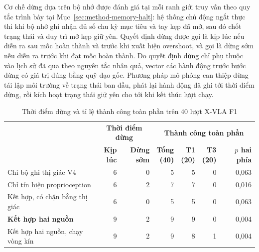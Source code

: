 \label{sec:halt-timing}
\label{sec:halt-forks}
Cơ chế dừng dựa trên bộ nhớ được đánh giá tại mỗi ranh giới truy vấn theo quy tắc trình bày tại Mục~\ref{sec:method-memory-halt}: hệ thống chủ động ngắt thực thi khi bộ nhớ ghi nhận đủ số chu kỳ mục tiêu và tay kẹp đã mở, sau đó chốt trạng thái và duy trì mở kẹp giữ yên. Quyết định dừng được gọi là kịp lúc nếu diễn ra sau mốc hoàn thành và trước khi xuất hiện overshoot, và gọi là dừng sớm nếu diễn ra trước khi đạt mốc hoàn thành. Do quyết định dừng chỉ phụ thuộc vào lịch sử đã qua theo nguyên tắc nhân quả, vector các hành động trước bước dừng có giá trị đúng bằng quỹ đạo gốc. Phương pháp mô phỏng can thiệp dừng tái lập môi trường về trạng thái ban đầu, phát lại hành động đã ghi tới thời điểm dừng, rồi kích hoạt trạng thái giữ yên cho tới khi kết thúc lượt chạy.

\begin{table}[htbp]
\centering\small
\caption{Thời điểm dừng và tỉ lệ thành công toàn phần trên 40 lượt X-VLA F1}
\label{tab:halt-combined}
\label{tab:halt-timing-combined}
\label{tab:halt-forks-combined}
\setlength{\tabcolsep}{3pt}
\begin{tabular}{|>{\raggedright\arraybackslash}p{}|r|r|r|r|r|r|}
\hline
\multirow{2}{*}{\shortstack[l]{\textbf{Nguồn quyết định}\\\textbf{dừng}}} & \multicolumn{2}{c|}{\textbf{Thời điểm dừng}} & \multicolumn{4}{c|}{\textbf{Thành công toàn phần}} \\
\cline{2-7}
 & \shortstack{\textbf{Kịp}\\\textbf{lúc}} & \shortstack{\textbf{Dừng}\\\textbf{sớm}} & \shortstack{\textbf{Tổng}\\\textbf{(40)}} & \shortstack{\textbf{T1}\\\textbf{(20)}} & \shortstack{\textbf{T3}\\\textbf{(20)}} & \shortstack{\textbf{$p$ hai}\\\textbf{phía}} \\ \hline
Chỉ bộ ghi thị giác V4 & 6 & 0 & 5 & 5 & 0 & 0,063 \\ \hline
Chỉ tín hiệu proprioception & 6 & 2 & 7 & 7 & 0 & 0,016 \\ \hline
Kết hợp, có chặn bằng thị giác & 6 & 0 & 5 & 5 & 0 & 0,063 \\ \hline
\textbf{Kết hợp hai nguồn} & 9 & 2 & 9 & 9 & 0 & 0,004 \\ \hline
Kết hợp hai nguồn, chạy vòng kín & 9 & 2 & 9 & 8 & 1 & 0,004 \\ \hline
\end{tabular}
\par\smallskip
\end{table}

